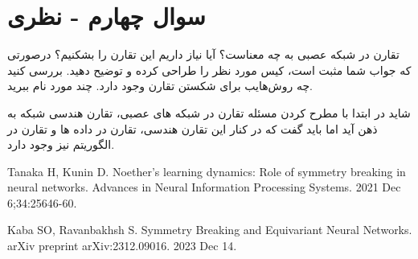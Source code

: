 \section{سوال چهارم - نظری}

تقارن در شبکه عصبی به چه معناست؟ آیا نیاز داریم این تقارن را بشکنیم؟ درصورتی که جواب شما مثبت است، کیس مورد نظر را طراحی کرده و توضیح دهید. بررسی کنید چه روش‌هایب برای شکستن تقارن وجود دارد. چند مورد نام ببرید.





\begin{qsolve}
 	شاید در ابتدا با مطرح کردن مسئله تقارن در شبکه های عصبی، تقارن هندسی شبکه به ذهن آید اما باید گفت که در کنار این تقارن هندسی، تقارن در داده ها و تقارن در الگوریتم نیز وجود دارد. \cite{ref1}
\end{qsolve}

















\begin{latin}
	\begin{thebibliography}{9}
		Tanaka H, Kunin D. Noether’s learning dynamics: Role of symmetry breaking in neural networks. Advances in Neural Information Processing Systems. 2021 Dec 6;34:25646-60.
		
		Kaba SO, Ravanbakhsh S. Symmetry Breaking and Equivariant Neural Networks. arXiv preprint arXiv:2312.09016. 2023 Dec 14.
	\end{thebibliography} 
\end{latin}